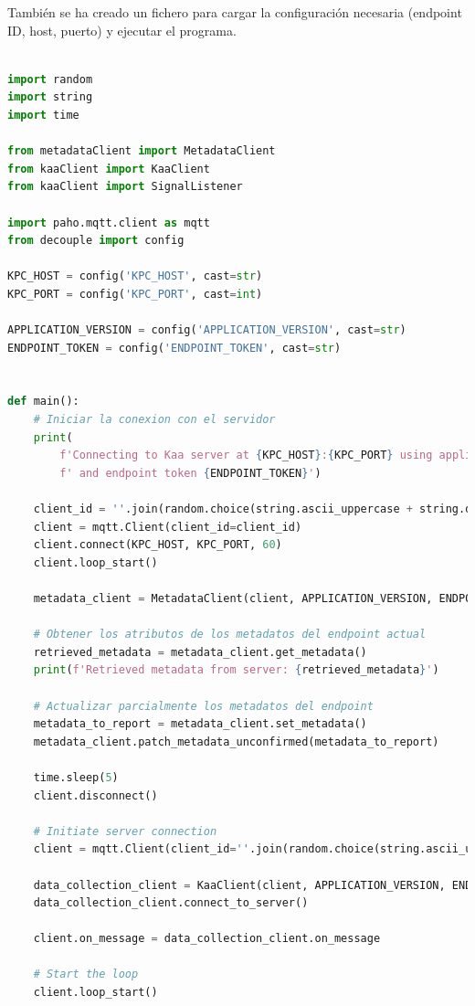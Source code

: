 {También se ha creado un fichero para cargar la configuración necesaria (endpoint ID, host, puerto) y ejecutar el programa.

\begin{lstlisting}[language=Python]

import random
import string
import time

from metadataClient import MetadataClient
from kaaClient import KaaClient
from kaaClient import SignalListener

import paho.mqtt.client as mqtt
from decouple import config

KPC_HOST = config('KPC_HOST', cast=str)
KPC_PORT = config('KPC_PORT', cast=int)

APPLICATION_VERSION = config('APPLICATION_VERSION', cast=str)
ENDPOINT_TOKEN = config('ENDPOINT_TOKEN', cast=str)


def main():
    # Iniciar la conexion con el servidor
    print(
        f'Connecting to Kaa server at {KPC_HOST}:{KPC_PORT} using application version {APPLICATION_VERSION}'
        f' and endpoint token {ENDPOINT_TOKEN}')

    client_id = ''.join(random.choice(string.ascii_uppercase + string.digits) for _ in range(6))
    client = mqtt.Client(client_id=client_id)
    client.connect(KPC_HOST, KPC_PORT, 60)
    client.loop_start()

    metadata_client = MetadataClient(client, APPLICATION_VERSION, ENDPOINT_TOKEN)

    # Obtener los atributos de los metadatos del endpoint actual
    retrieved_metadata = metadata_client.get_metadata()
    print(f'Retrieved metadata from server: {retrieved_metadata}')

    # Actualizar parcialmente los metadatos del endpoint
    metadata_to_report = metadata_client.set_metadata()
    metadata_client.patch_metadata_unconfirmed(metadata_to_report)

    time.sleep(5)
    client.disconnect()

    # Initiate server connection
    client = mqtt.Client(client_id=''.join(random.choice(string.ascii_uppercase + string.digits) for _ in range(6)))

    data_collection_client = KaaClient(client, APPLICATION_VERSION, ENDPOINT_TOKEN, KPC_HOST, KPC_PORT)
    data_collection_client.connect_to_server()

    client.on_message = data_collection_client.on_message

    # Start the loop
    client.loop_start()


\end{lstlisting}}
